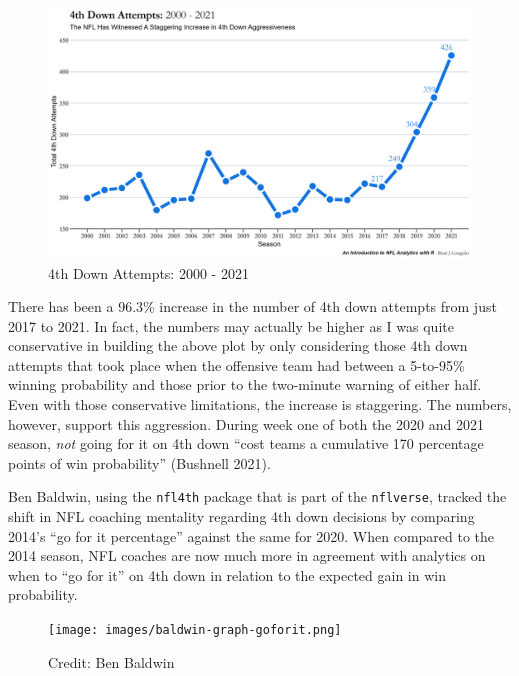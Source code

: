 \documentclass[
  letterpaper,
]{krantz}
\begin{document}
\begin{figure}

{\centering \includegraphics[width=9.71in,height=\textheight]{images/4th-down-attempts.png}

}

\caption{4th Down Attempts: 2000 - 2021}

\end{figure}

There has been a 96.3\% increase in the number of 4th down attempts from
just 2017 to 2021. In fact, the numbers may actually be higher as I was
quite conservative in building the above plot by only considering those
4th down attempts that took place when the offensive team had between a
5-to-95\% winning probability and those prior to the two-minute warning
of either half. Even with those conservative limitations, the increase
is staggering. The numbers, however, support this aggression. During
week one of both the 2020 and 2021 season, \emph{not} going for it on
4th down ``cost teams a cumulative 170 percentage points of win
probability'' (Bushnell 2021).

Ben Baldwin, using the \texttt{nfl4th} package that is part of the
\texttt{nflverse}, tracked the shift in NFL coaching mentality regarding
4th down decisions by comparing 2014's ``go for it percentage'' against
the same for 2020. When compared to the 2014 season, NFL coaches are now
much more in agreement with analytics on when to ``go for it'' on 4th
down in relation to the expected gain in win probability.

\begin{figure}

{\centering \texttt{[image: images/baldwin-graph-goforit.png]}

}

\caption{Credit: Ben Baldwin}

\end{figure}
\end{document}
